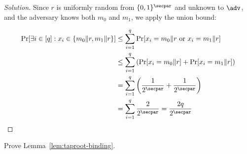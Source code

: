 \begin{proof}[Solution]
Since $r$ is uniformly random from $\{0,1\}^\secpar$ and unknown to $\adv$, and the adversary knows both $m_0$ and $m_1$, we apply the union bound:

\begin{align*}
  \Pr[\exists i \in [q] : x_i \in \{m_0 \| r, m_1 \| r\}] &\leq \sum_{i=1}^q \Pr[x_i = m_0 \| r \text{ or } x_i = m_1 \| r] \\
  &\leq \sum_{i=1}^q \left(\Pr[x_i = m_0 \| r] + \Pr[x_i = m_1 \| r]\right) \\
  &= \sum_{i=1}^q \left(\frac{1}{2^\secpar} + \frac{1}{2^\secpar}\right) \\
  &= \sum_{i=1}^q \frac{2}{2^\secpar} = \frac{2q}{2^\secpar}
\end{align*}
\end{proof}

\begin{exercise}
  Prove Lemma~\ref{lem:taproot-binding}.
\end{exercise}

